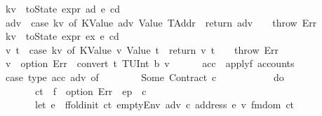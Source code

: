 \begin{isabellebody}
\ \ \ \ \ \ kv\ {\isasymleftarrow}\ toState\ {\isacharparenleft}{\kern0pt}expr\ ad\ e\ cd{\isacharparenright}{\kern0pt}{\isacharsemicolon}{\kern0pt}\isanewline
\ \ \ \ \ \ adv\ {\isasymleftarrow}\ case\ kv\ of\ {\isacharparenleft}{\kern0pt}KValue\ adv{\isacharcomma}{\kern0pt}\ Value\ TAddr{\isacharparenright}{\kern0pt}\ {\isasymRightarrow}\ return\ adv\ {\isacharbar}{\kern0pt}\ {\isacharunderscore}{\kern0pt}\ {\isasymRightarrow}\ throw\ Err{\isacharsemicolon}{\kern0pt}\isanewline
\ \ \ \ \ \ kv{\isacharprime}{\kern0pt}\ {\isasymleftarrow}\ toState\ {\isacharparenleft}{\kern0pt}expr\ ex\ e\ cd{\isacharparenright}{\kern0pt}{\isacharsemicolon}{\kern0pt}\isanewline
\ \ \ \ \ \ {\isacharparenleft}{\kern0pt}v{\isacharcomma}{\kern0pt}\ t{\isacharparenright}{\kern0pt}\ {\isasymleftarrow}\ case\ kv{\isacharprime}{\kern0pt}\ of\ {\isacharparenleft}{\kern0pt}KValue\ v{\isacharcomma}{\kern0pt}\ Value\ t{\isacharparenright}{\kern0pt}\ {\isasymRightarrow}\ return\ {\isacharparenleft}{\kern0pt}v{\isacharcomma}{\kern0pt}\ t{\isacharparenright}{\kern0pt}\ {\isacharbar}{\kern0pt}\ {\isacharunderscore}{\kern0pt}\ {\isasymRightarrow}\ throw\ Err{\isacharsemicolon}{\kern0pt}\isanewline
\ \ \ \ \ \ v{\isacharprime}{\kern0pt}\ {\isasymleftarrow}\ option\ Err\ {\isacharparenleft}{\kern0pt}{\isasymlambda}{\isacharunderscore}{\kern0pt}{\isachardot}{\kern0pt}\ convert\ t\ {\isacharparenleft}{\kern0pt}TUInt\ b{}{}{}{\isacharparenright}{\kern0pt}\ v{\isacharparenright}{\kern0pt}{\isacharsemicolon}{\kern0pt}\isanewline
\ \ \ \ \ \ acc\ {\isasymleftarrow}\ applyf\ accounts{\isacharsemicolon}{\kern0pt}\isanewline
\ \ \ \ \ \ case\ type\ {\isacharparenleft}{\kern0pt}acc\ adv{\isacharparenright}{\kern0pt}\ of\isanewline
\ \ \ \ \ \ \ \ Some\ {\isacharparenleft}{\kern0pt}Contract\ c{\isacharparenright}{\kern0pt}\ {\isasymRightarrow}\isanewline
\ \ \ \ \ \ \ \ \ \ do\ {\isacharbraceleft}{\kern0pt}\isanewline
\ \ \ \ \ \ \ \ \ \ \ \ {\isacharparenleft}{\kern0pt}ct{\isacharcomma}{\kern0pt}\ {\isacharunderscore}{\kern0pt}{\isacharcomma}{\kern0pt}\ f{\isacharparenright}{\kern0pt}\ {\isasymleftarrow}\ option\ Err\ {\isacharparenleft}{\kern0pt}{\isasymlambda}{\isacharunderscore}{\kern0pt}{\isachardot}{\kern0pt}\ ep\ {\isachardollar}{\kern0pt}{\isachardollar}{\kern0pt}\ c{\isacharparenright}{\kern0pt}{\isacharsemicolon}{\kern0pt}\isanewline
\ \ \ \ \ \ \ \ \ \ \ \ let\ e{\isacharprime}{\kern0pt}\ {\isacharequal}{\kern0pt}\ ffold{\isacharunderscore}{\kern0pt}init\ ct\ {\isacharparenleft}{\kern0pt}emptyEnv\ adv\ c\ {\isacharparenleft}{\kern0pt}address\ e{\isacharparenright}{\kern0pt}\ v{\isacharprime}{\kern0pt}{\isacharparenright}{\kern0pt}\ {\isacharparenleft}{\kern0pt}fmdom\ ct{\isacharparenright}{\kern0pt}{\isacharsemicolon}{\kern0pt}\isanewline

\end{isabellebody}
